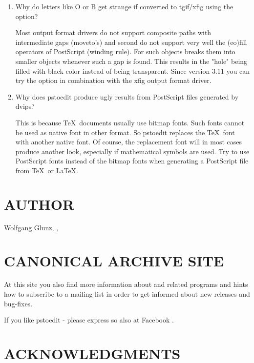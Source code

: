 \documentclass[english,a4paper]{article}
\begin{document}
\begin{enumerate}
\item Why do letters like O or B get strange if converted to tgif/xfig
using the  option?

Most output format drivers do not support composite paths with
intermediate gaps (moveto's) and second do not support very well the (eo)fill
operators of PostScript (winding rule). For such objects  breaks
them into smaller objects whenever such a gap is found. This results in the
"hole" being filled with black color instead of being transparent. Since
version 3.11 you can try the  option in combination with the xfig
output format driver.


\item Why does pstoedit produce ugly results from PostScript files generated by dvips?

This is because \TeX\ documents usually use bitmap fonts. Such fonts cannot be used as native
font in other format. So pstoedit replaces the \TeX\ font with another native
font. Of course, the replacement font will in most cases produce another
look, especially if mathematical symbols are used.
Try to use PostScript fonts instead of the bitmap fonts when generating a PostScript file from \TeX\ or \LaTeX.


\end{enumerate}

\section{AUTHOR}

Wolfgang Glunz, , 


\section{CANONICAL ARCHIVE SITE}


At this site you also find more information about  and related
programs and hints how to subscribe to a mailing list in order to get informed
about new releases and bug-fixes.

If you like pstoedit - please express so also at Facebook .


\section{ACKNOWLEDGMENTS}
\end{document}
